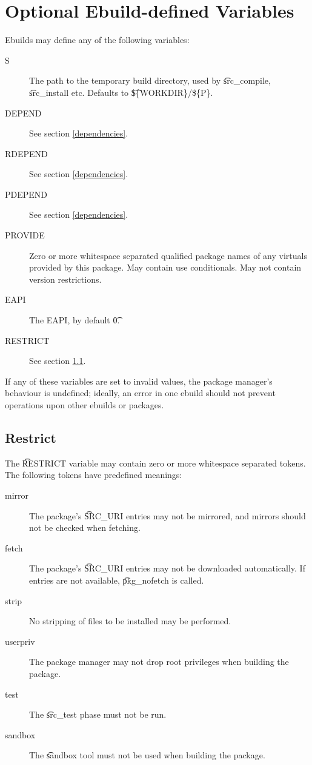 \section{Optional Ebuild-defined Variables}

Ebuilds may define any of the following variables:

\begin{description}
\item[S] The path to the temporary build directory, used by \t{src\_compile}, \t{src\_install}
    etc. Defaults to \t{\$\{WORKDIR\}/\$\{P\}}.
\item[DEPEND] See section \ref{dependencies}.
\item[RDEPEND] See section \ref{dependencies}.
\item[PDEPEND] See section \ref{dependencies}.
\item[PROVIDE] Zero or more whitespace separated qualified package names of any 
    virtuals provided by this package. May contain use conditionals. May not contain version
    restrictions. \label{ebuild-var-provide}
\item[EAPI] The EAPI, by default \t{0}.
\item[RESTRICT] See section \ref{restrict}.
\end{description}

If any of these variables are set to invalid values, the package manager's behaviour is undefined;
ideally, an error in one ebuild should not prevent operations upon other ebuilds or packages.

\subsection{Restrict}
\label{restrict}

The \t{RESTRICT} variable may contain zero or more whitespace separated tokens. The following
tokens have predefined meanings:

\begin{description}
\item[mirror] The package's \t{SRC\_URI} entries may not be mirrored, and mirrors should not
    be checked when fetching.
\item[fetch] The package's \t{SRC\_URI} entries may not be downloaded automatically. If
    entries are not available, \t{pkg\_nofetch} is called.
\item[strip] No stripping of files to be installed may be performed.
\item[userpriv] The package manager may not drop root privileges when building the package.
\item[test] The \t{src\_test} phase must not be run.
\item[sandbox] The \t{sandbox} tool must not be used when building the package.
\end{description}

